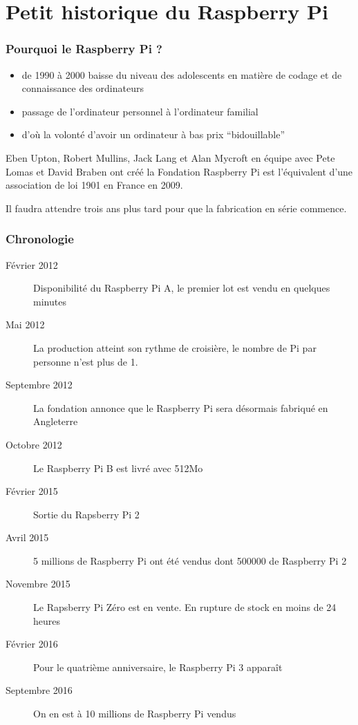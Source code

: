\section{Petit historique du Raspberry Pi}

\begin{frame}
\frametitle{Pourquoi le Raspberry Pi ?}

\begin{itemize}
	\item de 1990 à 2000 baisse du niveau des adolescents en matière de codage et de connaissance des ordinateurs
	\item passage de l'ordinateur personnel à l'ordinateur familial
	\item d'où la volonté d'avoir un ordinateur à bas prix ``bidouillable''
\end{itemize}

Eben Upton, Robert Mullins, Jack Lang et Alan Mycroft en équipe avec Pete Lomas et David Braben ont créé la Fondation Raspberry Pi est l'équivalent d'une association de loi 1901 en France en 2009.

Il faudra attendre trois ans plus tard pour que la fabrication en série commence.

\end{frame}

\begin{frame}
\frametitle{Chronologie}
\begin{description}
	\item[Février 2012] Disponibilité  du Raspberry Pi A, le premier lot est vendu en quelques minutes
	\item[Mai 2012] La production atteint son rythme de croisière, le nombre de Pi par personne n'est plus de 1.
	\item[Septembre 2012] La fondation annonce que le Raspberry Pi sera désormais fabriqué en Angleterre
	\item[Octobre 2012] Le Raspberry Pi B est livré avec 512Mo
	\item[Février 2015] Sortie du Rapsberry Pi 2
	\item[Avril 2015] 5 millions de Raspberry Pi ont été vendus dont 500000 de Raspberry Pi 2
	\item[Novembre 2015] Le Rapsberry Pi Zéro est en vente. En rupture de stock en moins de 24 heures
	\item[Février 2016] Pour le quatrième anniversaire, le Raspberry Pi 3 apparaît
	\item[Septembre 2016] On en est à 10 millions de Raspberry Pi vendus
\end{description}
\end{frame}


